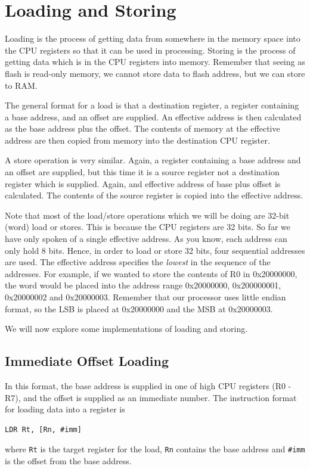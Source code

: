 \chapter{Loading and Storing}

Loading is the process of getting data from somewhere in the memory space into the CPU registers so that it can be used in processing. Storing is the process of getting data which is in the CPU registers into memory. Remember that seeing as flash is read-only memory, we cannot store data to flash address, but we can store to RAM.

The general format for a load is that a destination register, a register containing a base address, and an offset are supplied. An effective address is then calculated as the base address plus the offset. The contents of memory at the effective address are then copied from memory into the destination CPU register.

A store operation is very similar. Again, a register containing a base address and an offset are supplied, but this time it is a source register not a destination register which is supplied. Again, and effective address of base plus offset is calculated. The contents of the source register is copied into the effective address. 

Note that most of the load/store operations which we will be doing are 32-bit (word) load or stores. This is because the CPU registers are 32 bits. So far we have only spoken of a single effective address. As you know, each address can only hold 8 bits. Hence, in order to load or store 32 bits, four sequential addresses are used. The effective address specifies the \emph{lowest} in the sequence of the addresses. For example, if we wanted to store the contents of R0 in 0x20000000, the word would be placed into the address range 0x20000000, 0x200000001, 0x20000002 and 0x20000003. Remember that our processor uses little endian format, so the LSB is placed at 0x20000000 and the MSB at 0x20000003.

We will now explore some implementations of loading and storing.

\section{Immediate Offset Loading}
In this format, the base address is supplied in one of high CPU registers (R0 - R7), and the offset is supplied as an immediate number. 
The instruction format for loading data into a register is
\begin{lstlisting}[fontadjust=true,frame=trBL]
LDR Rt, [Rn, #imm]
\end{lstlisting}
where \texttt{Rt} is the target register for the load, \texttt{Rn} contains the base address and \texttt{\#imm} is the offset from the base address.

